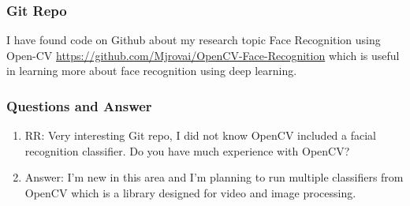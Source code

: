  \subsubsection{Git Repo}
I have found code on Github about my research topic Face Recognition using Open-CV \url{https://github.com/Mjrovai/OpenCV-Face-Recognition} which is useful in learning more about face recognition using deep learning.


\subsubsection{Questions and Answer} 
\begin{enumerate}
	\item RR: Very interesting Git repo, I did not know OpenCV included a facial recognition classifier. Do you have much experience with OpenCV?
        \item Answer: I'm new in this area and I'm planning to run multiple classifiers from OpenCV which is a library designed for video and image processing. 

\end{enumerate}
